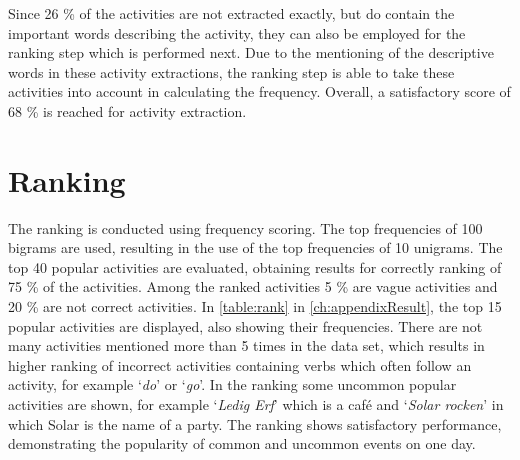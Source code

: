 Since 26 \% of the activities are not extracted exactly, but do contain the important words describing the activity, they can also be employed for the ranking step which is performed next. Due to the mentioning of the descriptive words in these activity extractions, the ranking step is able to take these activities into account in calculating the frequency. Overall, a satisfactory score of 68 \% is reached for activity extraction.


\section{Ranking}\label{sec:res_ranking}
The ranking is conducted using frequency scoring. The top frequencies of 100 bigrams are used, resulting in the use of the top frequencies of 10 unigrams. The top 40 popular activities are evaluated, obtaining results for correctly ranking of 75 \% of the activities. Among the ranked activities 5 \% are vague activities and 20 \% are not correct activities. In \autoref{table:rank} in \autoref{ch:appendixResult}, the top 15 popular activities are displayed, also showing their frequencies. There are not many activities mentioned more than 5 times in the data set, which results in higher ranking of incorrect activities containing verbs which often follow an activity, for example `\textit{do}' or `\textit{go}'. In the ranking some uncommon popular activities are shown, for example `\textit{Ledig Erf}' which is a caf\'e and `\textit{Solar rocken}' in which Solar is the name of a party. The ranking shows satisfactory performance, demonstrating the popularity of common and uncommon events on one day. 
\fi